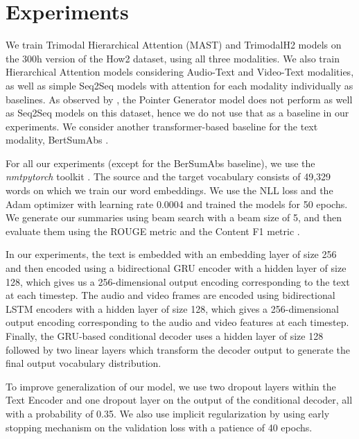 \documentclass[11pt,a4paper]{article}
\begin{document}
\section{Experiments}
We train Trimodal Hierarchical Attention (MAST) and TrimodalH2 models on the 300h version of the How2 dataset, using all three modalities. We also train Hierarchical Attention models considering Audio-Text and Video-Text modalities, as well as simple Seq2Seq models with attention for each modality individually as baselines. As observed by \citet{palaskar2019multimodal}, the Pointer Generator model \cite{see2017get} does not perform as well as Seq2Seq models on this dataset, hence we do not use that as a baseline in our experiments. We consider another transformer-based baseline for the text modality, BertSumAbs \cite{liu2019text}.

For all our experiments (except for the BerSumAbs baseline), we use the \emph{nmtpytorch} toolkit \cite{caglayan2017nmtpy}. The source and the target vocabulary consists of 49,329 words on which we train our word embeddings. We use the NLL loss and the Adam optimizer \cite{kingma2014adam} with learning rate 0.0004 and trained the models for 50 epochs. We generate our summaries using beam search with a beam size of 5, and then evaluate them using the ROUGE metric \cite{lin2004rouge} and the Content F1 metric \cite{palaskar2019multimodal}.

In our experiments, the text is embedded with an embedding layer of size 256 and then encoded using a bidirectional GRU encoder \cite{cho2014learning} with a hidden layer of size 128, which gives us a 256-dimensional output encoding corresponding to the text at each timestep. The audio and video frames are encoded using bidirectional LSTM encoders \cite{hochreiter1997long} with a hidden layer of size 128, which gives a 256-dimensional output encoding corresponding to the audio and video features at each timestep. Finally, the GRU-based conditional decoder uses a hidden layer of size 128 followed by two linear layers which transform the decoder output to generate the final output vocabulary distribution.

To improve generalization of our model, we use two dropout layers within the Text Encoder and one dropout layer on the output of the conditional decoder, all with a probability of 0.35. We also use implicit regularization by using early stopping mechanism on the validation loss with a patience of 40 epochs.
\end{document}
